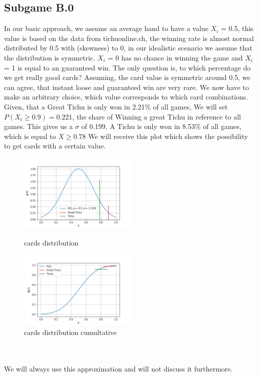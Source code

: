 \subsection{Subgame B.0}
In our basic approach, we assume an average hand to have a value $X_i$ = 0.5, this value is based on the data from tichuonline.ch, the winning rate is almost normal distributed by 0.5 with (skewness) to 0, in our idealistic scenario we assume that the distribution is symmetric. $X_i$ = 0 has no chance in winning the game and $X_i$ = 1 is equal to an guaranteed win. The only question is, to which percentage do we get really good cards? Assuming, the card value is symmetric around 0.5, we can agree, that instant loose and guaranteed win are very rare. We now have to make an arbitrary choice, which value corresponds to which card combinations. 
Given, that a Great Tichu is only won in 2.21$\%$ of all games, We will set $P(X_i \geq 0.9) = 0.221$, the share of Winning a great Tichu in reference to all games. This gives us a $\sigma$ of 0.199. A Tichu is only won in 8.53$\%$ of all games, which is equal to $X \geq 0.78$
We will receive this plot which shows the possibility to get cards with a certain value.
\begin{figure}[h]
    \centering
    \includegraphics[width=0.5\textwidth]{Bilder/cards_distribution}
    \caption{cards distribution}
    \label{fig:meine-grafik}
    \centering
    \includegraphics[width=0.5\textwidth]{Bilder/cards_distribution_cumultative}
    \caption{cards distribution cumultative}
    \label{fig:meine-grafik}
\end{figure}
\\ \\We will always use this approximation and will not discuss it furthermore.

